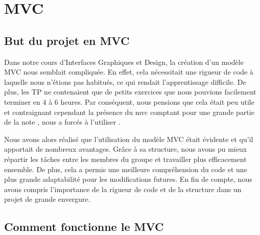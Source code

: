 \documentclass[a4paper,12pt]{article} %
\begin{document}
\section{MVC}
\subsection{But du projet en MVC}
Dans notre cours d'Interfaces Graphiques et Design, la création d'un modèle MVC nous semblait compliquée. En effet, cela nécessitait une rigueur de code à laquelle nous n'étions pas habitués, ce qui rendait l'apprentissage difficile. De plus, les TP ne contenaient que de petits exercices que nous pouvions facilement terminer en 4 à 6 heures. Par conséquent, nous pensions que cela était peu utile et contraignant cependant la présence du mvc comptant pour une grande  partie de la note , nous a forcés à l'utiliser .

Nous avons alors réalisé que l'utilisation du modèle MVC était évidente et qu'il apportait de nombreux avantages. Grâce à sa structure, nous avons pu mieux répartir les tâches entre les membres du groupe et travailler plus efficacement ensemble. De plus, cela a permis une meilleure compréhension du code et une plus grande adaptabilité pour les modifications futures. En fin de compte, nous avons compris l'importance de la rigueur de code et de la structure dans un projet de grande envergure.
 
\subsection{Comment fonctionne le MVC}
\end{document}
